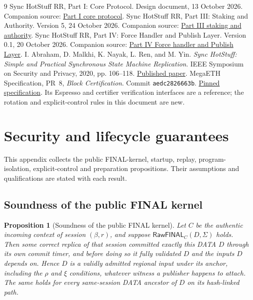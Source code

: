 \documentclass[11pt,a4paper]{article}
\newcommand{\tagg}[1]{\ensuremath{\mathsf{#1}}}
\newtheorem{proposition}[proposition]{Proposition}
\newcounter{protocol}
\begin{document}
\begingroup\small
\begin{thebibliography}{9}
Sync HotStuff RR, Part I: Core Protocol. Design document, 13 October 2026.
Companion source: \href{run:sync_hotstuff_rr_part1_core.tex}{Part I core protocol}.
Sync HotStuff RR, Part III: Staking and Authority. Version 5, 24 October 2026.
Companion source: \href{run:sync_hotstuff_rr_part3_staking_v5.tex}{Part III staking and authority}.
Sync HotStuff RR, Part IV: Force Handler and Publish Layer.
Version 0.1, 20 October 2026.
Companion source: \href{run:sync_hotstuff_rr_part4_force_v0_1.tex}{Part IV Force handler and Publish Layer}.
I. Abraham, D. Malkhi, K. Nayak, L. Ren, and M. Yin.
\emph{Sync HotStuff: Simple and Practical Synchronous State Machine Replication}.
IEEE Symposium on Security and Privacy, 2020, pp. 106--118.
\href{https://conferences.computer.org/sp/pdfs/sp/2020/349700a106.pdf}{Published paper}.
MegaETH Specification, PR~8, \emph{Block Certification}.
Commit \texttt{aedc2826663b}.
\href{https://github.com/megaeth-labs/specification/tree/aedc2826663b134ee25d26bea17e70c6d23d321c/specs/block-certification}{Pinned specification}.
Its Espresso and certifier verification interfaces are a reference;
the rotation and explicit-control rules in this document are new.
\end{thebibliography}
\endgroup
\appendix
{}
\section{Security and lifecycle guarantees}
\label{app:security}
This appendix collects the public FINAL-kernel, startup, replay,
program-isolation, explicit-control and preparation propositions.
Their assumptions and qualifications are stated with each result.

\subsection{Soundness of the public FINAL kernel}
\label{app:final-kernel-proof}
\begin{proposition}[Soundness of the public FINAL kernel]
\label{prop:final-kernel-soundness}
Let $C$ be the authentic incoming context of session $(\beta,r)$, and
suppose $\tagg{RawFINAL}_C(D,\Sigma)$ holds. Then some correct replica of
that session committed exactly this DATA $D$ through its own commit
timer, and before doing so it fully validated $D$ and the inputs $D$
depends on. Hence $D$ is a validly admitted regional input under its
anchor, including the $\rho$ and $\xi$ conditions, whatever witness a
publisher happens to attach. The same holds for every same-session DATA
ancestor of $D$ on its hash-linked path.
\end{proposition}
\end{document}

